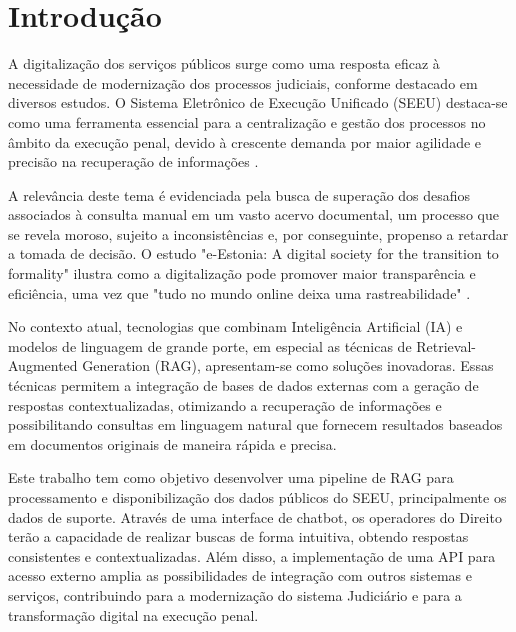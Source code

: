 
\chapter{Introdução}
\label{sec:introducao}

A digitalização dos serviços públicos surge como uma resposta eficaz à necessidade de modernização dos processos judiciais, conforme destacado em diversos estudos. O Sistema Eletrônico de Execução Unificado (SEEU) destaca-se como uma ferramenta essencial para a centralização e gestão dos processos no âmbito da execução penal, devido à crescente demanda por maior agilidade e precisão na recuperação de informações \cite{divald2021e-estonia}.

A relevância deste tema é evidenciada pela busca de superação dos desafios associados à consulta manual em um vasto acervo documental, um processo que se revela moroso, sujeito a inconsistências e, por conseguinte, propenso a retardar a tomada de decisão. O estudo "e-Estonia: A digital society for the transition to formality" ilustra como a digitalização pode promover maior transparência e eficiência, uma vez que "tudo no mundo online deixa uma rastreabilidade" \cite{divald2021e-estonia}.

No contexto atual, tecnologias que combinam Inteligência Artificial (IA) e modelos de linguagem de grande porte, em especial as técnicas de Retrieval-Augmented Generation (RAG), apresentam-se como soluções inovadoras. Essas técnicas permitem a integração de bases de dados externas com a geração de respostas contextualizadas, otimizando a recuperação de informações e possibilitando consultas em linguagem natural que fornecem resultados baseados em documentos originais de maneira rápida e precisa.

Este trabalho tem como objetivo desenvolver uma pipeline de RAG para processamento e disponibilização dos dados públicos do SEEU, principalmente os dados de suporte. Através de uma interface de chatbot, os operadores do Direito terão a capacidade de realizar buscas de forma intuitiva, obtendo respostas consistentes e contextualizadas. Além disso, a implementação de uma API para acesso externo amplia as possibilidades de integração com outros sistemas e serviços, contribuindo para a modernização do sistema Judiciário e para a transformação digital na execução penal.

